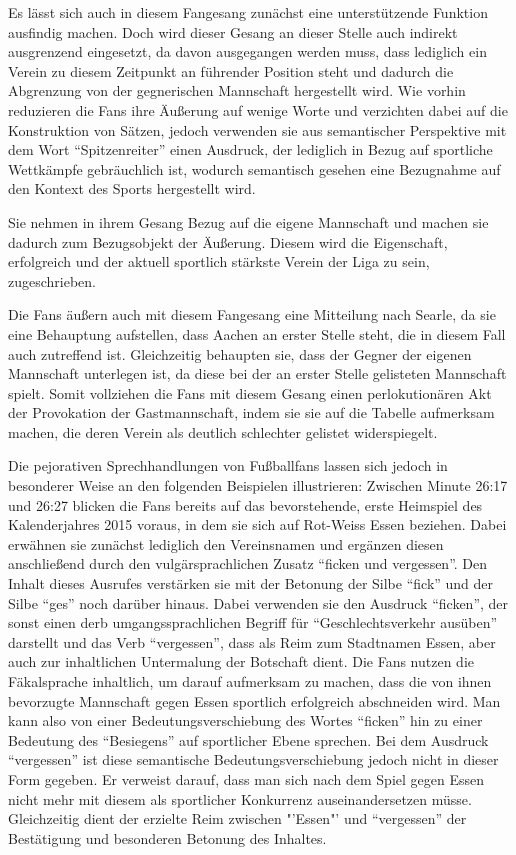 Es lässt sich auch in diesem Fangesang zunächst eine unterstützende Funktion ausfindig machen.
Doch wird dieser Gesang an dieser Stelle auch indirekt ausgrenzend eingesetzt, da davon ausgegangen werden muss, dass lediglich ein Verein zu diesem Zeitpunkt an führender Position steht und dadurch die Abgrenzung von der gegnerischen Mannschaft hergestellt wird.
Wie vorhin reduzieren die Fans ihre Äußerung auf wenige Worte und verzichten dabei auf die Konstruktion von Sätzen, jedoch verwenden sie aus semantischer Perspektive mit dem Wort "`Spitzenreiter"' einen Ausdruck, der lediglich in Bezug auf sportliche Wettkämpfe gebräuchlich ist, wodurch semantisch gesehen eine Bezugnahme auf den Kontext des Sports hergestellt wird.

Sie nehmen in ihrem Gesang Bezug auf die eigene Mannschaft und machen sie dadurch zum Bezugsobjekt der Äußerung.
Diesem wird die Eigenschaft, erfolgreich und der aktuell sportlich stärkste Verein der Liga zu sein, zugeschrieben.

Die Fans äußern auch mit diesem Fangesang eine Mitteilung nach Searle, da sie eine Behauptung aufstellen, dass Aachen an erster Stelle steht, die in diesem Fall auch zutreffend ist.
Gleichzeitig behaupten sie, dass der Gegner der eigenen Mannschaft unterlegen ist, da diese bei der an erster Stelle gelisteten Mannschaft spielt.
Somit vollziehen die Fans mit diesem Gesang einen perlokutionären Akt der Provokation der Gastmannschaft, indem sie sie auf die Tabelle aufmerksam machen, die deren Verein als deutlich schlechter gelistet widerspiegelt.

Die pejorativen Sprechhandlungen von Fußballfans lassen sich jedoch in besonderer Weise an den folgenden Beispielen illustrieren:
Zwischen Minute 26:17 und 26:27 blicken die Fans bereits auf das bevorstehende, erste Heimspiel des Kalenderjahres 2015 voraus, in dem sie sich auf Rot-Weiss Essen beziehen.
Dabei erwähnen sie zunächst lediglich den Vereinsnamen und ergänzen diesen anschließend durch den vulgärsprachlichen Zusatz "`ficken und vergessen"'.
Den Inhalt dieses Ausrufes verstärken sie mit der Betonung der Silbe "`fick"' und der Silbe "`ges"' noch darüber hinaus.
Dabei verwenden sie den Ausdruck "`ficken"', der sonst einen derb umgangssprachlichen Begriff für "`Geschlechtsverkehr ausüben"' darstellt und das Verb "`vergessen"', dass als Reim zum Stadtnamen Essen, aber auch zur inhaltlichen Untermalung der Botschaft dient.
Die Fans nutzen die Fäkalsprache inhaltlich, um darauf aufmerksam zu machen, dass die von ihnen bevorzugte Mannschaft gegen Essen sportlich erfolgreich abschneiden wird.
Man kann also von einer Bedeutungsverschiebung des Wortes "`ficken"' hin zu einer Bedeutung des "`Besiegens"' auf sportlicher Ebene sprechen.
Bei dem Ausdruck "`vergessen"' ist diese semantische Bedeutungsverschiebung jedoch nicht in dieser Form gegeben.
Er verweist darauf, dass man sich nach dem Spiel gegen Essen nicht mehr mit diesem als sportlicher Konkurrenz auseinandersetzen müsse.
Gleichzeitig dient der erzielte Reim zwischen "'Essen"' und "`vergessen"' der Bestätigung und besonderen Betonung des Inhaltes.

